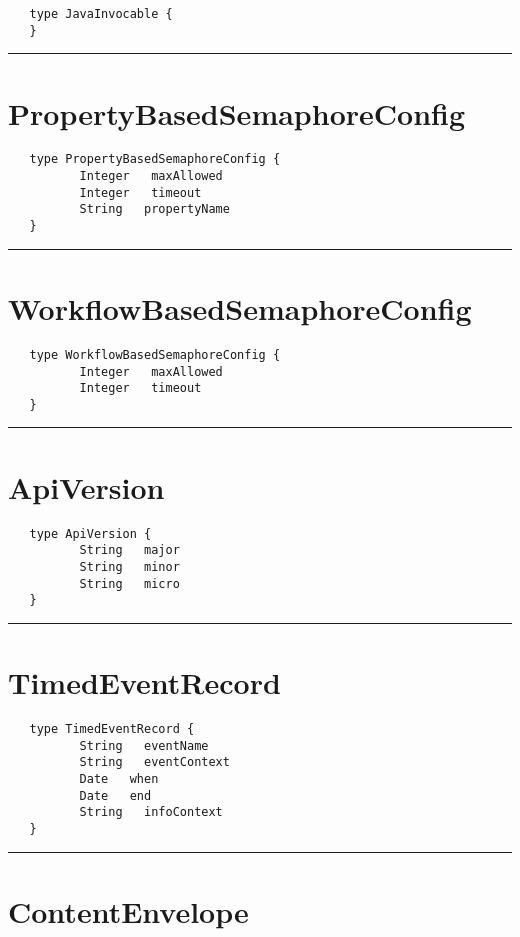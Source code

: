 \begin{verbatim}
   type JavaInvocable {
   }
\end{verbatim}

\rule{15cm}{2pt}
\section{PropertyBasedSemaphoreConfig}
\label{type:PropertyBasedSemaphoreConfig}

\begin{verbatim}
   type PropertyBasedSemaphoreConfig {
          Integer   maxAllowed
          Integer   timeout
          String   propertyName
   }
\end{verbatim}

\rule{15cm}{2pt}
\section{WorkflowBasedSemaphoreConfig}
\label{type:WorkflowBasedSemaphoreConfig}

\begin{verbatim}
   type WorkflowBasedSemaphoreConfig {
          Integer   maxAllowed
          Integer   timeout
   }
\end{verbatim}

\rule{15cm}{2pt}
\section{ApiVersion}
\label{type:ApiVersion}

\begin{verbatim}
   type ApiVersion {
          String   major
          String   minor
          String   micro
   }
\end{verbatim}

\rule{15cm}{2pt}
\section{TimedEventRecord}
\label{type:TimedEventRecord}

\begin{verbatim}
   type TimedEventRecord {
          String   eventName
          String   eventContext
          Date   when
          Date   end
          String   infoContext
   }
\end{verbatim}

\rule{15cm}{2pt}
\section{ContentEnvelope}
\label{type:ContentEnvelope}

